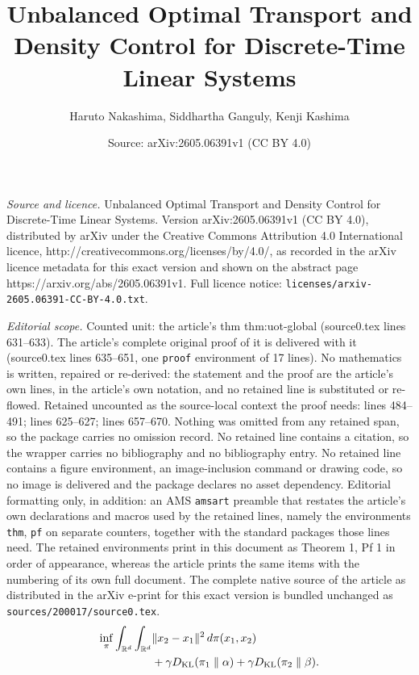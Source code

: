 \documentclass[10pt,a4paper]{amsart}
\title{Unbalanced Optimal Transport and Density Control for Discrete-Time Linear Systems}
\author{Haruto Nakashima, Siddhartha Ganguly, Kenji Kashima}
\date{Source: arXiv:2605.06391v1 (CC BY 4.0)}
\newcommand{\KL}[2]{D_{\mathrm{KL}}(#1 \parallel #2)}
\newcommand{\R}{{\mathbb R}}
\newcommand{\Rd}{\R ^{d}}
\newcommand{\rmd}{{\rm d}}
\begin{document}
\maketitle

\noindent\emph{Source and licence.} Unbalanced Optimal Transport and Density Control for Discrete-Time Linear Systems. Version arXiv:2605.06391v1 (CC BY 4.0), distributed by arXiv under the Creative Commons Attribution 4.0 International licence, http://creativecommons.org/licenses/by/4.0/, as recorded in the arXiv licence metadata for this exact version and shown on the abstract page https://arxiv.org/abs/2605.06391v1. Full licence notice: \texttt{licenses/arxiv-2605.06391-CC-BY-4.0.txt}.\par\smallskip

\noindent\textit{Editorial scope.} Counted unit: the article's thm thm:uot-global (source0.tex lines 631--633). The article's complete original proof of it is delivered with it (source0.tex lines 635--651, one \texttt{proof} environment of 17 lines). No mathematics is written, repaired or re-derived: the statement and the proof are the article's own lines, in the article's own notation, and no retained line is substituted or re-flowed.  Retained uncounted as the source-local context the proof needs: lines 484--491; lines 625--627; lines 657--670.  Nothing was omitted from any retained span, so the package carries no omission record.  No retained line contains a citation, so the wrapper carries no bibliography and no bibliography entry.  No retained line contains a figure environment, an image-inclusion command or drawing code, so no image is delivered and the package declares no asset dependency.  Editorial formatting only, in addition: an AMS \texttt{amsart} preamble that restates the article's own declarations and macros used by the retained lines, namely the environments \texttt{thm}, \texttt{pf} on separate counters, together with the standard packages those lines need.  The retained environments print in this document as Theorem 1, Pf 1 in order of appearance, whereas the article prints the same items with the numbering of its own full document.  The complete native source of the article as distributed in the arXiv e-print for this exact version is bundled unchanged as \texttt{sources/200017/source0.tex}.
\begin{equation}\label{eq:uot}
\begin{aligned}
\inf_{\pi} 
\int_{\Rd}\int_{\Rd} & \|x_2-x_1\|^2 \,\rmd \pi(x_1,x_2) \\
&+ \gamma \KL{\pi_1}{\alpha}
+ \gamma \KL{\pi_2}{\beta}.
\end{aligned}
\end{equation}
\end{document}
